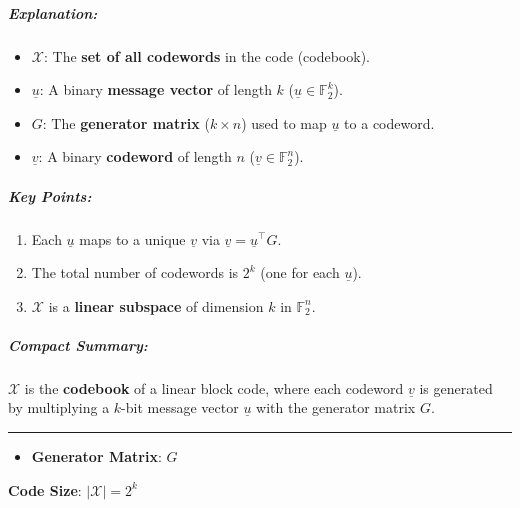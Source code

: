 \documentclass[11pt]{article}
\providecommand{\tightlist}{%
      \setlength{\itemsep}{0pt}\setlength{\parskip}{0pt}}
\begin{document}
\subparagraph{Explanation:}\label{explanation-1}

\begin{itemize}
\tightlist
\item
  \(\mathcal{X}\): The \textbf{set of all codewords} in the code
  (codebook).
\item
  \(\underline{u}\): A binary \textbf{message vector} of length \(k\)
  (\(\underline{u} \in \mathbb{F}_2^k\)).
\item
  \(G\): The \textbf{generator matrix} (\(k \times n\)) used to map
  \(\underline{u}\) to a codeword.
\item
  \(\underline{v}\): A binary \textbf{codeword} of length \(n\)
  (\(\underline{v} \in \mathbb{F}_2^n\)).
\end{itemize}

\subparagraph{Key Points:}\label{key-points}

\begin{enumerate}
\def\labelenumi{\arabic{enumi}.}
\tightlist
\item
  Each \(\underline{u}\) maps to a unique \(\underline{v}\) via
  \(\underline{v} = \underline{u}^\top G\).
\item
  The total number of codewords is \(2^k\) (one for each
  \(\underline{u}\)).
\item
  \(\mathcal{X}\) is a \textbf{linear subspace} of dimension \(k\) in
  \(\mathbb{F}_2^n\).
\end{enumerate}

\subparagraph{Compact Summary:}\label{compact-summary-1}

\(\mathcal{X}\) is the \textbf{codebook} of a linear block code, where
each codeword \(\underline{v}\) is generated by multiplying a \(k\)-bit
message vector \(\underline{u}\) with the generator matrix \(G\).

\begin{center}\rule{0.5\linewidth}{0.5pt}\end{center}

\begin{itemize}
\tightlist
\item
  \textbf{Generator Matrix}: \(G\)
\end{itemize}

\textbf{Code Size}: \(|\mathcal{X}| = 2^k\)
\end{document}
